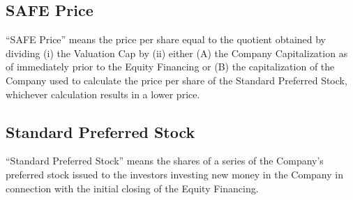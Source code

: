 \subsection{SAFE Price}
\label{sec:safeprice}

“SAFE Price” means the price per share equal to the quotient obtained
by dividing (i) the Valuation Cap by (ii) either (A) the Company
Capitalization as of immediately prior to the Equity Financing or (B)
the capitalization of the Company used to calculate the price per
share of the Standard Preferred Stock, whichever calculation results
in a lower price.

\subsection{Standard Preferred Stock}
\label{sec:standardpreferredstock}

“Standard Preferred Stock” means the shares of a series of the
Company’s preferred stock issued to the investors investing new money
in the Company in connection with the initial closing of the Equity
Financing.
